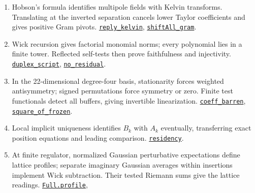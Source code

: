 \documentclass[
  letterpaper,
  11pt]{article}
\providecommand{\tightlist}{%
  \setlength{\itemsep}{0pt}\setlength{\parskip}{0pt}}
\begin{document}
\begin{enumerate}
\def\labelenumi{\arabic{enumi}.}
\tightlist
\item
  Hobson's formula identifies multipole fields with Kelvin transforms.
  Translating at the inverted separation cancels lower Taylor
  coefficients and gives positive Gram pivots.
  \href{https://github.com/yang-mills-group/OpenAI-YM-20261028/blob/3456e5e75cf8d4cd558955a5c7638fba2d68f464/YM/Extra/FREE_DETECTOR_ALGEBRA/Kelvin.lean\#L111-L113}{\texttt{reply\_kelvin}},
  \href{https://github.com/yang-mills-group/OpenAI-YM-20261028/blob/3456e5e75cf8d4cd558955a5c7638fba2d68f464/YM/Extra/FREE_DETECTOR_ALGEBRA/PositiveLeg.lean\#L126-L133}{\texttt{shiftAll\_gram}}.
\item
  Wick recursion gives factorial monomial norms; every polynomial lies
  in a finite tower. Reflected self-tests then prove faithfulness and
  injectivity.
  \href{https://github.com/yang-mills-group/OpenAI-YM-20261028/blob/3456e5e75cf8d4cd558955a5c7638fba2d68f464/YM/Extra/FREE_DETECTOR_ALGEBRA/PowerGram.lean\#L100-L116}{\texttt{duplex\_script}},
  \href{https://github.com/yang-mills-group/OpenAI-YM-20261028/blob/3456e5e75cf8d4cd558955a5c7638fba2d68f464/YM/Extra/FREE_DETECTOR_ALGEBRA/Rank.lean\#L38-L54}{\texttt{no\_residual}}.
\item
  In the 22-dimensional degree-four basis, stationarity forces weighted
  antisymmetry; signed permutations force symmetry or zero. Finite test
  functionals detect all buffers, giving invertible linearization.
  \href{https://github.com/yang-mills-group/OpenAI-YM-20261028/blob/3456e5e75cf8d4cd558955a5c7638fba2d68f464/YM/Pert/Rigid/Camera.lean\#L90-L105}{\texttt{coeff\_barren}},
  \href{https://github.com/yang-mills-group/OpenAI-YM-20261028/blob/3456e5e75cf8d4cd558955a5c7638fba2d68f464/YM/Pert/Position/Detect.lean\#L131-L147}{\texttt{square\_of\_frozen}}.
\item
  Local implicit uniqueness identifies \(B_k\) with \(A_k\) eventually,
  transferring exact position equations and leading comparison.
  \href{https://github.com/yang-mills-group/OpenAI-YM-20261028/blob/3456e5e75cf8d4cd558955a5c7638fba2d68f464/YM/Pert/Position/Four.lean\#L32-L43}{\texttt{residency}}.
\item
  At finite regulator, normalized Gaussian perturbative expectations
  define lattice profiles; separate imaginary Gaussian averages within
  insertions implement Wick subtraction. Their tested Riemann sums give
  the lattice readings.
  \href{https://github.com/yang-mills-group/OpenAI-YM-20261028/blob/3456e5e75cf8d4cd558955a5c7638fba2d68f464/YM/Pert/Lattice/Bundles.lean\#L55-L56}{\texttt{Full.profile}},

\end{enumerate}
\end{document}
